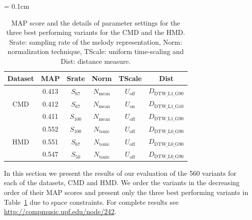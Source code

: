 \begin{table} 
	\centering
	\tabcolsep = 0.1cm
	\begin{tabular}{ c | c c c c c}
		\hline\hline
		Dataset   	& 	MAP	&	Srate		&	Norm 	&	TScale 		&	Dist \\	
		\hline
		\multirow{3}{*}{CMD}   	
		& 	0.413 	&	$S_{67}$			&	$N_{\mathrm{mean}}$ 	&	$U_{\mathrm{off}}$		&	$D_{\mathrm{DTW\_L1\_G90}}$\\	
		& 	0.412 	&	$S_{67}$		&	$N_{\mathrm{mean}}$ 	&	$U_{\mathrm{on}}$		&	$D_{\mathrm{DTW\_L1\_G10}}$\\	
		& 	0.411	&	$S_{100}$		&	$N_{\mathrm{mean}}$ 	&	$U_{\mathrm{off}}$		&	$D_{\mathrm{DTW\_L1\_G90}}$\\	
		\hline		
		\multirow{3}{*}{HMD}   	
		& 	0.552	&	$S_{100}$		&	$N_{\mathrm{tonic}}$ 	&	$U_{\mathrm{off}}$		&	$D_{\mathrm{DTW\_L0\_G90}}$\\	
		& 	0.551 	&	$S_{67}$	&	$N_{\mathrm{tonic}}$ 	&	$U_{\mathrm{off}}$		&	$D_{\mathrm{DTW\_L0\_G90}}$\\	
		& 	0.547 	&	$S_{50}$		&	$N_{\mathrm{tonic}}$ 	&	$U_{\mathrm{off}}$		&	$D_{\mathrm{DTW\_L0\_G90}}$\\	
		\hline\hline
		
	\end{tabular}
	\caption{MAP score and the details of parameter settings for the three best performing variants for the CMD and the HMD. Srate: sampling rate of the melody representation, Norm: normalization technique, TScale: uniform time-scaling and  Dist: distance measure.}\vspace{-1em}
	\label{tab:results5Best}
\end{table}


In this section we present the results of our evaluation of the 560 variants for each of the datasets, CMD and HMD.     We order the variants in the decreasing order of their MAP scores and present only the three best performing variants in Table~\ref{tab:results5Best} due to space constraints. For complete results see \url{http://compmusic.upf.edu/node/242}. 


